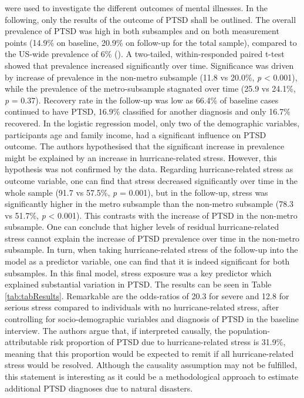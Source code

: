 \documentclass[
]{krantz}
\begin{document}
were used to investigate the different outcomes of mental illnesses. In the following, only the results of the outcome of PTSD shall be outlined.
The overall prevalence of PTSD was high in both subsamples and on both measurement points (14.9\% on baseline, 20.9\% on follow-up for the total sample), compared to the US-wide prevalence of 6\% (\citet{goldstein2016}). A two-tailed, within-responded paired t-test showed that prevalence increased significantly over time. Significance was driven by increase of prevalence in the non-metro subsample (11.8 vs 20.0\%, \emph{p} \textless{} 0.001), while the prevalence of the metro-subsample stagnated over time (25.9 vs 24.1\%, \emph{p} = 0.37). Recovery rate in the follow-up was low as 66.4\% of baseline cases continued to have PTSD, 16.9\% classified for another diagnosis and only 16.7\% recovered. In the logistic regression model, only two of the demographic variables, participants age and family income, had a significant influence on PTSD outcome.
The authors hypothesised that the significant increase in prevalence might be explained by an increase in hurricane-related stress. However, this hypothesis was not confirmed by the data. Regarding hurricane-related stress as outcome variable, one can find that stress decreased significantly over time in the whole sample (91.7 vs 57.5\%, \emph{p} = 0.001), but in the follow-up, stress was significantly higher in the metro subsample than the non-metro subsample (78.3 vs 51.7\%, \emph{p} \textless{} 0.001). This contrasts with the increase of PTSD in the non-metro subsample. One can conclude that higher levels of residual hurricane-related stress cannot explain the increase of PTSD prevalence over time in the non-metro subsample. In turn, when taking hurricane-related stress of the follow-up into the model as a predictor variable, one can find that it is indeed significant for both subsamples. In this final model, stress exposure was a key predictor which explained substantial variation in PTSD. The results can be seen in Table \ref{tab:tabResults}. Remarkable are the odds-ratios of 20.3 for severe and 12.8 for serious stress compared to individuals with no hurricane-related stress, after controlling for socio-demographic variables and diagnosis of PTSD in the baseline interview. The authors argue that, if interpreted causally, the population-attributable risk proportion of PTSD due to hurricane-related stress is 31.9\%, meaning that this proportion would be expected to remit if all hurricane-related stress would be resolved. Although the causality assumption may not be fulfilled, this statement is interesting as it could be a methodological approach to estimate additional PTSD diagnoses due to natural disasters.
\end{document}
